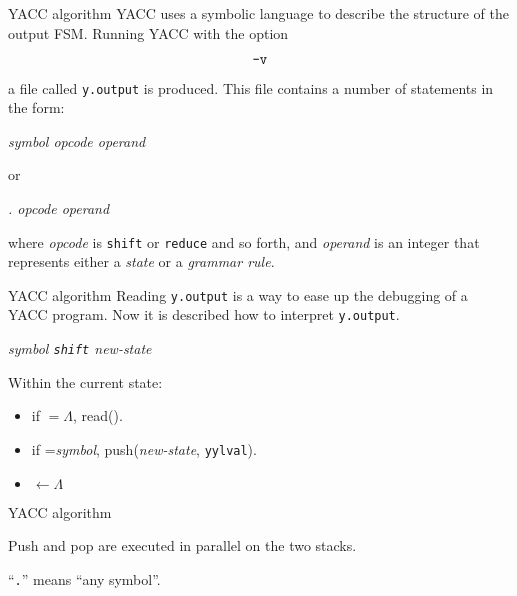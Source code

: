 \begin{frame}[fragile]{YACC algorithm}
YACC uses a symbolic language to describe the structure of the output FSM.
Running YACC with the option

$$\hbox{\tt -v}$$

a file called {\tt y.output} is produced. This file contains
a number of statements in the form:


\vspace{20pt}

\begin{center}\em
symbol  opcode  operand
\end{center}

or
\begin{center}\em
.  opcode  operand
\end{center}


\vspace{20pt}

where {\em opcode} is {\tt shift} or {\tt reduce} and so forth,
and {\em operand} is an integer that represents either a
\emph{state\/} or a
\emph{grammar rule}.
\end{frame}

\begin{frame}[fragile]{YACC algorithm}
Reading
{\tt y.output} is a way to ease up the debugging of a YACC program.
Now it is described how to interpret {\tt y.output}.


\vspace{20pt}

\begin{center}\fbox{\shift}\end{center}
\begin{center}\em  symbol    {\tt shift}  new-state \end{center}


\vspace{20pt}

Within the current state:


\vspace{20pt}

\begin{itemize}
\item if \lat $=\Lambda$, read(\lat).
\item if \lat={\em symbol}, push({\em new-state\/}, {\tt yylval}).
\item \lat{} $\leftarrow\Lambda$
\end{itemize}
\end{frame}

\begin{frame}[fragile]{YACC algorithm}

Push and pop are executed in parallel on the two stacks.


\vspace{20pt}

``{\tt .}'' means ``any symbol''.
\end{frame}

